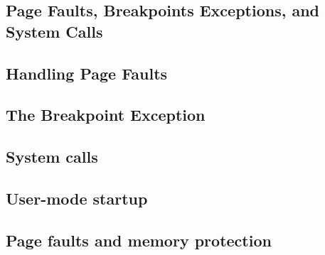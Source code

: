 \documentclass{article}
\begin{document}
\begin{CJK*}{UTF8}{gkai}
\section{Page Faults, Breakpoints Exceptions, and System Calls}

\subsection{Handling Page Faults}

\subsection{The Breakpoint Exception}

\subsection{System calls}

\subsection{User-mode startup}

\subsection{Page faults and memory protection}


\clearpage

\end{CJK*}
\end{document}
